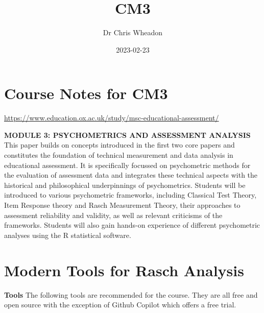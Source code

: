 \documentclass[
  letterpaper,
  DIV=11,
  numbers=noendperiod]{scrreprt}
\title{CM3}
\author{Dr Chris Wheadon}
\date{2023-02-23}
\renewcommand*\contentsname{Table of contents}
\newcommand\contentsname{Table of contents}
\begin{document}
\maketitle
\ifdefined\Shaded\renewenvironment{Shaded}{\begin{tcolorbox}[interior hidden, boxrule=0pt, borderline west={3pt}{0pt}{shadecolor}, breakable, sharp corners, frame hidden, enhanced]}{\end{tcolorbox}}\fi

\renewcommand*\contentsname{Table of contents}
{
\hypersetup{linkcolor=}
\setcounter{tocdepth}{2}
\tableofcontents
}

\hypertarget{course-notes-for-cm3}{%
\chapter*{Course Notes for CM3}\label{course-notes-for-cm3}}


\url{https://www.education.ox.ac.uk/study/msc-educational-assessment/}

\textbf{MODULE 3: PSYCHOMETRICS AND ASSESSMENT ANALYSIS} This paper
builds on concepts introduced in the first two core papers and
constitutes the foundation of technical measurement and data analysis in
educational assessment. It is specifically focussed on psychometric
methods for the evaluation of assessment data and integrates these
technical aspects with the historical and philosophical underpinnings of
psychometrics. Students will be introduced to various psychometric
frameworks, including Classical Test Theory, Item Response theory and
Rasch Measurement Theory, their approaches to assessment reliability and
validity, as well as relevant criticisms of the frameworks. Students
will also gain hands-on experience of different psychometric analyses
using the R statistical software.


\hypertarget{modern-tools-for-rasch-analysis}{%
\chapter{Modern Tools for Rasch
Analysis}\label{modern-tools-for-rasch-analysis}}

\textbf{Tools} The following tools are recommended for the course. They
are all free and open source with the exception of Github Copilot which
offers a free trial.
\end{document}
